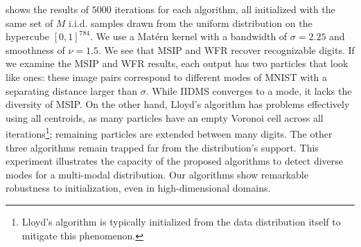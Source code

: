  shows the results of $5000$ iterations for each algorithm, all initialized with the same set of $M$ i.i.d. samples drawn from the uniform distribution on the hypercube $[0,1]^{784}$. We use a Matérn kernel with a bandwidth of $\sigma = 2.25$ and smoothness of $\nu = 1.5$. We see that MSIP and WFR recover recognizable digits. If we examine the  MSIP and WFR results, each output has two particles that look like ones: these image pairs correspond to different modes of MNIST with a separating distance larger than $\sigma$.
While IIDMS converges to a mode, it lacks the diversity of MSIP. On the other hand, Lloyd's algorithm has problems effectively using all centroids, as many particles have an empty Voronoi cell across all iterations\footnote{Lloyd's algorithm is typically initialized from the data distribution itself to mitigate this phenomenon.}; 
remaining particles are extended between many digits. The other three algorithms remain trapped far from the distribution's support. 
This experiment illustrates the
capacity of the proposed algorithms to detect diverse modes for a multi-modal distribution. Our algorithms show remarkable robustness to initialization, even in high-dimensional domains. 













